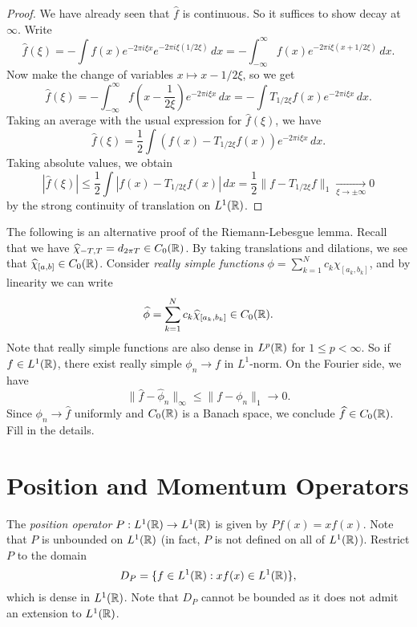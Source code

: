 \begin{proof}
  We have already seen that $\widehat{f}$
  is continuous. So it
  suffices to show decay at $\infty$.
  Write
  \[
    \widehat{f}(\xi)
    = - \int f(x) e^{-2\pi i \xi x}
    e^{-2\pi i \xi (1 / 2\xi)}\, dx
    = -\int_{-\infty}^\infty f(x) e^{-2\pi i \xi (x + 1 / 2\xi)}\, dx.
  \]
  Now make the change of variables
  $x \mapsto x - 1 / 2\xi$, so we get
  \[
    \widehat{f}(\xi)
    = - \int_{-\infty}^\infty f\left(x - \frac{1}{2\xi}\right) e^{-2\pi i \xi x}\, dx
    = - \int T_{1 / 2\xi} f(x) e^{-2\pi i \xi x}\, dx.
  \]
  Taking an average with the usual
  expression for $\widehat{f}(\xi)$, we
  have
  \[
    \widehat{f}(\xi)
    = \frac{1}{2} \int (f(x) - T_{1 / 2\xi} f(x)) e^{-2\pi i \xi x}\, dx.
  \]
  Taking absolute values, we obtain
  \[
    |\widehat{f}(\xi)|
    \le \frac{1}{2} \int |f(x) - T_{1 / 2\xi} f(x)|\, dx
    = \frac{1}{2} \|f - T_{1 / 2\xi} f\|_1
    \xrightarrow[\xi \to \pm \infty]{}
    0
  \]
  by the strong continuity of translation
  on $L^1(\mathbb{R})$.
\end{proof}

\begin{exercise}
  The following is an alternative proof
  of the Riemann-Lebesgue lemma.
  Recall that we have $\widehat{\chi}_{-T, T} = d_{2\pi T} \in C_0(\mathbb{R})$.
  By taking translations and dilations, we
  see that $\widehat{\chi}_{[a, b]} \in C_0(\mathbb{R})$.
  Consider \emph{really simple functions}
  $\phi = \sum_{k = 1}^N c_k \chi_{[a_k, b_k]}$,
  and by linearity we can write
  \[
    \widehat{\phi}
    = \sum_{k = 1}^N c_k \widehat{\chi}_{[a_k, b_k]} \in C_0(\mathbb{R}).
  \]
  Note that really simple functions are also
  dense in $L^p(\mathbb{R})$ for $1 \le p < \infty$.
  So if $f \in L^1(\mathbb{R})$, there exist
  really simple $\phi_n \to f$ in $L^1$-norm.
  On the Fourier side, we have
  \[
    \|\widehat{f} - \widehat{\phi}_n\|_\infty
    \le \|f - \phi_n\|_1 \longrightarrow 0.
  \]
  Since $\phi_n \to \widehat{f}$ uniformly
  and $C_0(\mathbb{R})$ is a Banach space,
  we conclude $\widehat{f} \in C_0(\mathbb{R})$.
  Fill in the details.
\end{exercise}

\section{Position and Momentum Operators}

\begin{definition}
  The \emph{position operator} $P : L^1(\mathbb{R}) \to L^1(\mathbb{R})$ is
  given by $P f(x) = x f(x)$.
  Note that $P$ is unbounded on $L^1(\mathbb{R})$
  (in fact, $P$ is not defined on all
  of $L^1(\mathbb{R})$).
  Restrict $P$ to the domain
  \[
    D_P = \{f \in L^1(\mathbb{R}) : xf(x) \in L^1(\mathbb{R})\},
  \]
  which is dense in $L^1(\mathbb{R})$.
  Note that $D_P$ cannot be bounded
  as it does not admit an extension
  to $L^1(\mathbb{R})$.
\end{definition}

